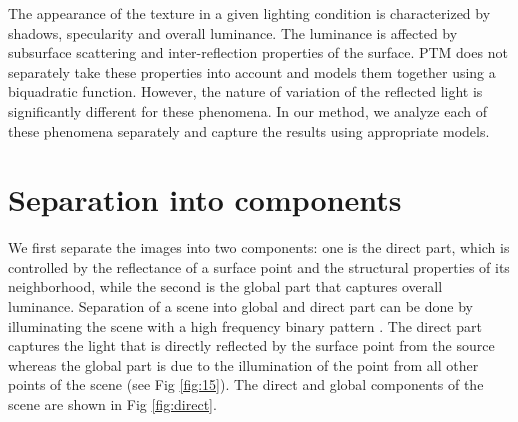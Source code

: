 The appearance of the texture in a given lighting condition is characterized by
shadows, specularity and overall luminance. The luminance is affected by
subsurface scattering and inter-reflection properties of the surface. PTM does
not separately take these properties into account and models them together using
a biquadratic function. However, the nature of variation of the reflected light
is significantly different for these phenomena.
In our method, we analyze each of these phenomena separately and capture the
results using appropriate models. 
\section{Separation into components}
We first separate the images into two components: one is the direct part, which is controlled by the reflectance of a
surface point and the structural properties of its neighborhood, while the
second is the global part that captures overall luminance. 
Separation of a scene into global and direct part can be done by illuminating the scene with a high
frequency binary pattern \cite{chap3-1}. The direct part captures the light that is
directly reflected by the surface point from the source whereas the global part
is due to the illumination of the point from all other points of the scene (see Fig \ref{fig:15}).
The direct and global components of the scene are shown in Fig \ref{fig:direct}.


